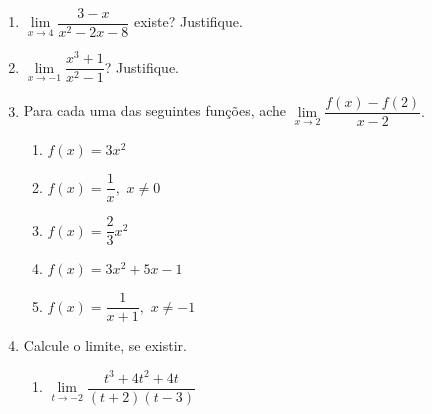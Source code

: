 \begin{enumerate}
    \begin{enumerate}
    \end{enumerate}

\item $\lim\limits_{x\to 4}\dfrac{ 3 - x}{x^2 - 2x - 8}$ existe? Justifique.

\item  $\lim\limits_{x\to -1}\dfrac{x^3+1}{x^2-1}$? Justifique.


    
\item Para cada uma das seguintes funções, ache $\lim\limits_{x\to2} \dfrac{f(x)-f(2)}{x-2}.$
\begin{multicols}{3}
    \begin{enumerate}
    \item $f(x)=3x^2$
    \item $f(x)=\dfrac{1}{x},$ $x\neq 0$
    \item $f(x)=\dfrac{2}{3}x^2$
    \item $f(x)=3x^2+5x-1$
    \item $f(x)=\dfrac{1}{x+1},$ $x\neq -1$
    \end{enumerate}
    \end{multicols}

\item Calcule o limite, se existir.
\begin{multicols}{3}
    \begin{enumerate}
    
    \item $ \lim\limits_{t\to-2} \dfrac{t^3 + 4t^2 + 4t}{ (t + 2)(t -3)}$ 
    

\end{enumerate}
\end{multicols}
\end{enumerate}

